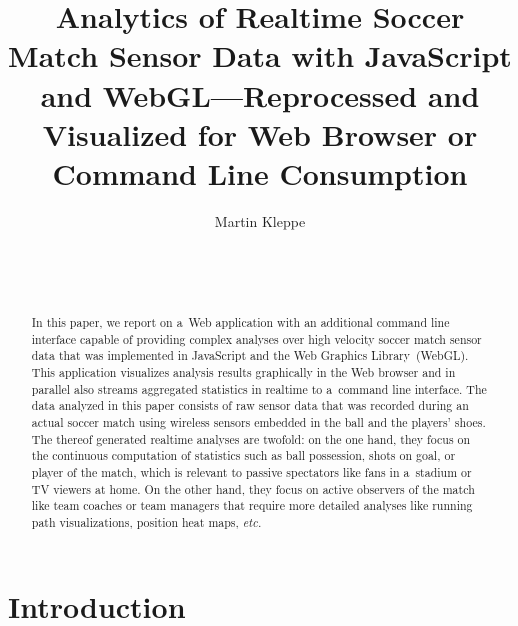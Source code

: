 \documentclass{sig-alternate}
\begin{document}
\title{Analytics of Realtime Soccer Match Sensor Data with JavaScript and WebGL---Reprocessed and Visualized for Web Browser or Command Line Consumption}

\author{
\alignauthor
Martin Kleppe\\
  \\
  \\
  \\
}
\maketitle

\begin{abstract}
In this paper, we report on a~Web application 
with an additional command line interface
capable of providing complex analyses
over high velocity soccer match sensor data
that was implemented in JavaScript
and the Web Graphics Library~(WebGL).
This application visualizes analysis results graphically
in the Web browser and in parallel also
streams aggregated statistics in realtime
to a~command line interface.
The data analyzed in this paper consists of raw sensor data
that was recorded during an actual soccer match
using wireless sensors embedded in the ball
and the players' shoes.
The thereof generated realtime analyses are twofold:
on the one hand, they focus on the continuous computation of statistics
such as ball possession, shots on goal, or player of the match,
which is relevant to passive spectators like fans in a~stadium
or TV viewers at home.
On the other hand, they focus on active observers of the match
like team coaches or team managers that require more detailed analyses
like running path visualizations, position heat maps, \emph{etc.}
\end{abstract}


\section{Introduction}
\end{document}
